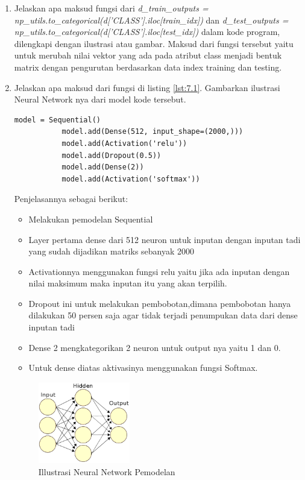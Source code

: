 \begin{enumerate}
	\item Jelaskan apa maksud fungsi dari \emph{d\_train\_outputs = np\_utils.to\_categorical(d['CLASS'].iloc[train\_idx])} dan \emph{d\_test\_outputs = np\_utils.to\_categorical(d['CLASS'].iloc[test\_idx])} dalam kode program, dilengkapi dengan ilustrasi atau gambar.
	\hfill \break
	Maksud dari fungsi tersebut yaitu untuk merubah nilai vektor yang ada pada atribut class menjadi bentuk matrix dengan pengurutan berdasarkan data index training dan testing.
	
	\item Jelaskan apa maksud dari fungsi di listing \ref{lst:7.1}. Gambarkan ilustrasi Neural Network nya dari model kode tersebut.
	\hfill \break
	\begin{lstlisting}[caption=Membuat model Neural Network,label={lst:7.1}]
		   model = Sequential()
		   model.add(Dense(512, input_shape=(2000,)))
		   model.add(Activation('relu'))
		   model.add(Dropout(0.5))
		   model.add(Dense(2))
		   model.add(Activation('softmax'))
	\end{lstlisting}
	\hfill \break
	Penjelasannya sebagai berikut:	
	\begin{itemize}
	\item Melakukan pemodelan Sequential
	\item Layer pertama dense dari 512 neuron untuk inputan dengan inputan tadi yang sudah dijadikan matriks sebanyak 2000
	\item Activationnya menggunakan fungsi relu yaitu jika ada inputan dengan nilai maksimum maka inputan itu yang akan terpilih.
	\item Dropout ini untuk melakukan pembobotan,dimana pembobotan hanya dilakukan 50 persen saja agar tidak terjadi penumpukan data dari dense inputan tadi
	\item Dense 2 mengkategorikan 2 neuron untuk output nya yaitu 1 dan 0.
	\item Untuk dense diatas aktivasinya menggunakan fungsi Softmax. 
	\end{itemize}
	
	\begin{figure}[H]
		\includegraphics[width=4cm]{figures/1174087/7/4.png}
		\centering
		\caption{Illustrasi Neural Network Pemodelan}
	\end{figure}
	

\end{enumerate}

